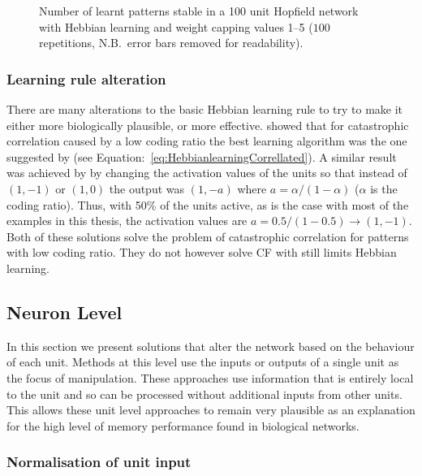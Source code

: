 \begin{figure}[tbp]
\small
\center
	
	\caption{Number of learnt patterns stable in a 100 unit Hopfield network  with Hebbian learning and weight capping values 1--5 ($100$ repetitions, N.B.\ error bars removed for readability).}
	\label{fig:WeightCap100num}
\end{figure}


\subsubsection{Learning rule alteration}

There are many alterations to the basic Hebbian learning rule to try to make it either more biologically plausible, or more effective. \citet{Dayan1991} showed that for catastrophic correlation caused by a low coding ratio the best learning algorithm was the one suggested by \citet{Amit1987b} (see Equation:~\eqref{eq:HebbianlearningCorrellated}). A similar result was achieved by \citet{Palm1996} by changing the activation values of the units so that instead of $(1,-1)$ or $(1,0)$ the output was $(1,-a)$ where $a = \alpha/(1-\alpha)$ ($\alpha$ is the coding ratio).  Thus, with 50\% of the units active, as is the case with most of the examples in this thesis, the activation values are $a=0.5/(1-0.5) \rightarrow (1,-1)$.  Both of these solutions solve the problem of catastrophic correlation for patterns with low coding ratio.  They do not however solve CF with still limits Hebbian learning.


\clearpage

\subsection{Neuron Level}

In this section we present solutions that alter the network based on the behaviour of each unit.  Methods at this level use the inputs or outputs of a single unit as the focus of manipulation.  These approaches use information that is entirely local to the unit and so can be processed without additional inputs from other units.  This allows these unit level approaches to remain very plausible as an explanation for the high level of memory performance found in biological networks.  

\subsubsection{Normalisation of unit input}

